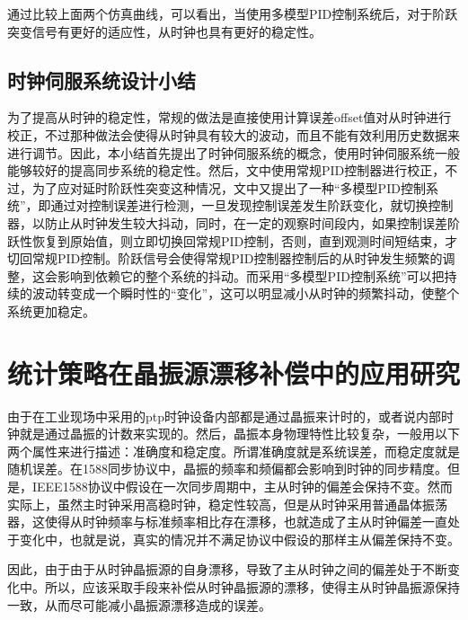 通过比较上面两个仿真曲线，可以看出，当使用多模型PID控制系统后，对于阶跃突变信号有更好的适应性，从时钟也具有更好的稳定性。

\subsection{时钟伺服系统设计小结}
为了提高从时钟的稳定性，常规的做法是直接使用计算误差offset值对从时钟进行校正，不过那种做法会使得从时钟具有较大的波动，而且不能有效利用历史数据来进行调节。因此，本小结首先提出了时钟伺服系统的概念，使用时钟伺服系统一般能够较好的提高同步系统的稳定性。然后，文中使用常规PID控制器进行校正，不过，为了应对延时阶跃性突变这种情况，文中又提出了一种“多模型PID控制系统”，即通过对控制误差进行检测，一旦发现控制误差发生阶跃变化，就切换控制器，以防止从时钟发生较大抖动，同时，在一定的观察时间段内，如果控制误差阶跃性恢复到原始值，则立即切换回常规PID控制，否则，直到观测时间短结束，才切回常规PID控制。阶跃信号会使得常规PID控制器控制后的从时钟发生频繁的调整，这会影响到依赖它的整个系统的抖动。而采用“多模型PID控制系统”可以把持续的波动转变成一个瞬时性的“变化”，这可以明显减小从时钟的频繁抖动，使整个系统更加稳定。

\section{统计策略在晶振源漂移补偿中的应用研究}
由于在工业现场中采用的ptp时钟设备内部都是通过晶振来计时的，或者说内部时钟就是通过晶振的计数来实现的。然后，晶振本身物理特性比较复杂，一般用以下两个属性来进行描述：准确度和稳定度。所谓准确度就是系统误差，而稳定度就是随机误差。在1588同步协议中，晶振的频率和频偏都会影响到时钟的同步精度。但是，IEEE1588协议中假设在一次同步周期中，主从时钟的偏差会保持不变。然而实际上，虽然主时钟采用高稳时钟，稳定性较高，但是从时钟采用普通晶体振荡器，这使得从时钟频率与标准频率相比存在漂移，也就造成了主从时钟偏差一直处于变化中，也就是说，真实的情况并不满足协议中假设的那样主从偏差保持不变。

因此，由于由于从时钟晶振源的自身漂移，导致了主从时钟之间的偏差处于不断变化中。所以，应该采取手段来补偿从时钟晶振源的漂移，使得主从时钟晶振源保持一致，从而尽可能减小晶振源漂移造成的误差。

